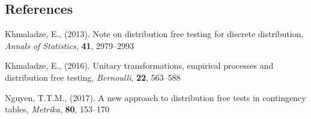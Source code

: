 \documentclass[12pt]{article}
\begin{document}
\subsection*{References}

\begin{description}

\item
Khmaladze, E., (2013). Note on distribution free testing for discrete distribution, \textit{Annals of Statistics}, \textbf{41}, 2979--2993

\item
Khmaladze, E., (2016). Unitary transformations, empirical processes and distribution free testing, \textit{Bernoulli}, \textbf{22}, 563--588


\item Nguyen, T.T.M., (2017). A new approach to distribution free tests in contingency tables, \textit{Metrika}, \textbf{80}, 153--170

\end{description}
\end{document}
